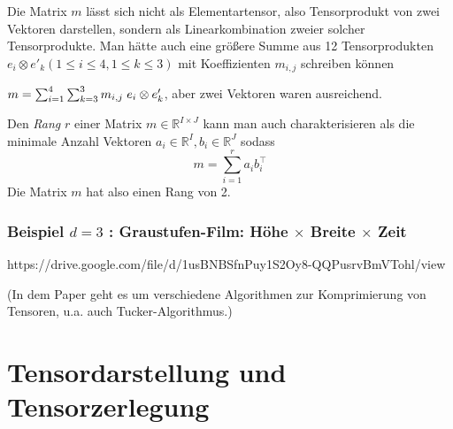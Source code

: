 \documentclass[11pt]{article} %
\begin{document}
\begin{changemargin}{0pt}{0pt}
Die Matrix $m$ lässt sich nicht als Elementartensor, also Tensorprodukt von zwei Vektoren darstellen, sondern als Linearkombination zweier solcher
Tensorprodukte. Man hätte auch eine größere Summe aus 12 Tensorprodukten $e_{i} \otimes e'_{k} (1\leq i \leq 4, 1\leq k \leq 3)$ mit
Koeffizienten $m_{i,j}$ schreiben können

$ m = \sum^{4}_{i=1} \sum^{3}_{k=3} m_{i,j} \hspace{1mm} e_{i} \otimes e'_{k} $, aber zwei Vektoren waren ausreichend.

Den \textit{Rang} $r$ einer Matrix $m \in \mathbb{R}^{I\times J}$ kann man auch charakterisieren als die minimale Anzahl Vektoren
$a_{i} \in \mathbb{R}^{I}, b_{i} \in \mathbb{R}^{J}$ sodass
\[ m = \sum^{r}_{i=1} a_{i}b_{i}^{\top} \]
Die Matrix $m$ hat also einen Rang von 2.
\end{changemargin}

\subsubsection{Beispiel $d=3$ : Graustufen-Film: Höhe $\times$ Breite $\times$ Zeit }
\begin{changemargin}{0pt}{0pt}

https://drive.google.com/file/d/1usBNBSfnPuy1S2Oy8-QQPusrvBmVTohl/view \cite{tucker_tensorsketch}

(In dem Paper geht es um verschiedene Algorithmen zur Komprimierung von Tensoren, u.a. auch Tucker-Algorithmus.)

\end{changemargin}

\section{Tensordarstellung und Tensorzerlegung}

\end{document}
